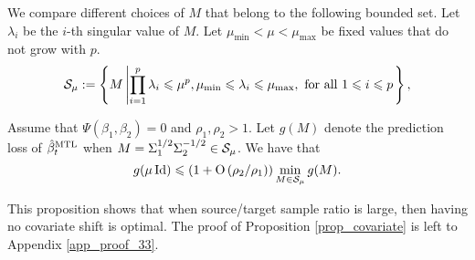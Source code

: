 We compare different choices of $M$ that belong to the following bounded set.
Let $\lambda_i$ be the $i$-th singular value of $M$.
Let $\mu_{\min} < \mu < \mu_{\max}$ be fixed values that do not grow with $p$.
\vspace{-0.025in}
{\small\begin{align*}
		\mathcal{S}_{\mu}:=\left\{ M \left| \prod_{i=1}^p \lambda_i \leqslant \mu^p, \mu_{\min} \leqslant \lambda_i\leqslant \mu_{\max}, \text{ for all } 1\leqslant i\leqslant p\right. \right\},
\end{align*}}
\begin{proposition}\label{prop_covariate}
	Assume that $\Psi(\beta_1, \beta_2) = 0$ and $\rho_1, \rho_2>1$.
	Let $g(M)$ denote the prediction loss of $\hat{\beta}_t^{\textup{MTL}}$ when $M = \Sigma_1^{1/2}\Sigma_2^{-1/2} \in\mathcal{S}_{\mu}$.
	We have that
	{\small\[ g(\mu\operatorname{Id}) \leqslant \left({1+ \operatorname{O}\left({\rho_2}/{\rho_1}  \right)}\right) \min_{M\in\mathcal{S}_{\mu}} g(M). \]}
\end{proposition}
This proposition shows that when source/target sample ratio is large, then having no covariate shift is optimal.
The proof of Proposition \ref{prop_covariate} is left to Appendix \ref{app_proof_33}.




